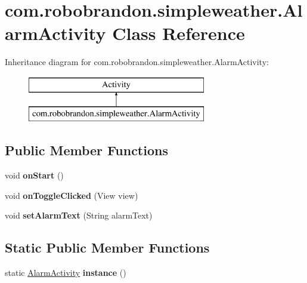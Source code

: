 \hypertarget{classcom_1_1robobrandon_1_1simpleweather_1_1_alarm_activity}{}\section{com.\+robobrandon.\+simpleweather.\+Alarm\+Activity Class Reference}
\label{classcom_1_1robobrandon_1_1simpleweather_1_1_alarm_activity}
Inheritance diagram for com.\+robobrandon.\+simpleweather.\+Alarm\+Activity\+:\begin{figure}[H]
\begin{center}
\leavevmode
\includegraphics[height=2.000000cm]{classcom_1_1robobrandon_1_1simpleweather_1_1_alarm_activity}
\end{center}
\end{figure}
\subsection*{Public Member Functions}
\begin{DoxyCompactItemize}
\item 
void {\bfseries on\+Start} ()\hypertarget{classcom_1_1robobrandon_1_1simpleweather_1_1_alarm_activity_aca2a5b30d11445f041110b56360e6828}{}\label{classcom_1_1robobrandon_1_1simpleweather_1_1_alarm_activity_aca2a5b30d11445f041110b56360e6828}

\item 
void {\bfseries on\+Toggle\+Clicked} (View view)\hypertarget{classcom_1_1robobrandon_1_1simpleweather_1_1_alarm_activity_a50907175c76e1f6ef2123b789973fa5f}{}\label{classcom_1_1robobrandon_1_1simpleweather_1_1_alarm_activity_a50907175c76e1f6ef2123b789973fa5f}

\item 
void {\bfseries set\+Alarm\+Text} (String alarm\+Text)\hypertarget{classcom_1_1robobrandon_1_1simpleweather_1_1_alarm_activity_a8f3e21e53d2b2ef4df07c738bbbe2ae4}{}\label{classcom_1_1robobrandon_1_1simpleweather_1_1_alarm_activity_a8f3e21e53d2b2ef4df07c738bbbe2ae4}

\end{DoxyCompactItemize}
\subsection*{Static Public Member Functions}
\begin{DoxyCompactItemize}
\item 
static \hyperlink{classcom_1_1robobrandon_1_1simpleweather_1_1_alarm_activity}{Alarm\+Activity} {\bfseries instance} ()\hypertarget{classcom_1_1robobrandon_1_1simpleweather_1_1_alarm_activity_a93c95929b6be5ab9ed665157dfd9cf2f}{}\label{classcom_1_1robobrandon_1_1simpleweather_1_1_alarm_activity_a93c95929b6be5ab9ed665157dfd9cf2f}

\end{DoxyCompactItemize}
